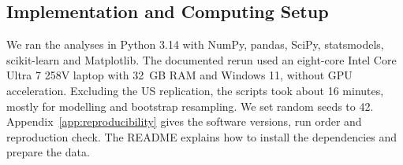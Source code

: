 \subsection{Implementation and Computing Setup}
\label{sec:methods-computing}

We ran the analyses in Python 3.14 with NumPy, pandas, SciPy, statsmodels, scikit-learn and Matplotlib. The documented rerun used an eight-core Intel Core Ultra 7 258V laptop with 32~GB RAM and Windows 11, without GPU acceleration. Excluding the US replication, the scripts took about 16 minutes, mostly for modelling and bootstrap resampling. We set random seeds to 42. Appendix~\ref{app:reproducibility} gives the software versions, run order and reproduction check. The README explains how to install the dependencies and prepare the data.

